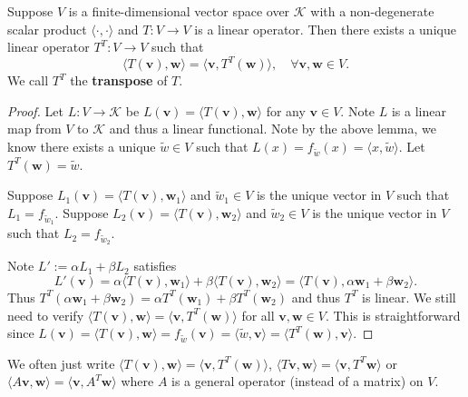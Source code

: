 \documentclass{ctexart}
\begin{document}
    \begin{mythm}\label{transpose existence}
        Suppose $V$ is a finite-dimensional vector space over $\mathcal{K}$ with a non-degenerate scalar product $\langle \cdot, \cdot \rangle$ and $T: V \to V$ is a linear operator. Then there exists a unique linear operator $T^T: V \to V$ such that
        \[
        \langle T(\mathbf{v}), \mathbf{w} \rangle = \langle \mathbf{v}, T^T (\mathbf{w}) \rangle, \quad \forall \mathbf{v}, \mathbf{w} \in V.
        \]
        We call $T^T$ the \textbf{transpose} of $T$.
    \end{mythm}
    \begin{proof}
        Let $L: V \to \mathcal{K}$ be $L(\mathbf{v}) = \langle T(\mathbf{v}), \mathbf{w} \rangle$ for any $\mathbf{v} \in V$. Note $L$ is a linear map from $V$ to $\mathcal{K}$ and thus a linear functional. Note by the above lemma, we know there exists a unique $\tilde{w} \in V$ such that $L(x)=f_{\tilde{w}}(x) = \langle x, \tilde{w} \rangle$. Let $T^T(\mathbf{w}) = \tilde{w}$.

        Suppose $L_1(\mathbf{v}) = \langle T(\mathbf{v}), \mathbf{w}_1 \rangle$ and $\tilde{w}_1 \in V$ is the unique vector in $V$ such that $L_1 = f_{\tilde{w}_1}$. Suppose $L_2(\mathbf{v}) = \langle T(\mathbf{v}), \mathbf{w}_2 \rangle$ and $\tilde{w}_2 \in V$ is the unique vector in $V$ such that $L_2 = f_{\tilde{w}_2}$.

        Note $L' := \alpha L_1 + \beta L_2$ satisfies
        \[
        L'(\mathbf{v}) = \alpha \langle T(\mathbf{v}), \mathbf{w}_1 \rangle + \beta \langle T(\mathbf{v}), \mathbf{w}_2 \rangle = \langle T(\mathbf{v}), \alpha \mathbf{w}_1 + \beta \mathbf{w}_2 \rangle.
        \]
        Thus $T^T(\alpha \mathbf{w}_1 + \beta \mathbf{w}_2) = \alpha T^T(\mathbf{w}_1) + \beta T^T(\mathbf{w}_2)$ and thus $T^T$ is linear. We still need to verify $\langle T(\mathbf{v}), \mathbf{w} \rangle = \langle \mathbf{v}, T^T (\mathbf{w}) \rangle$ for all $\mathbf{v}, \mathbf{w} \in V$. This is straightforward since $L(\mathbf{v}) = \langle T(\mathbf{v}), \mathbf{w} \rangle = f_{\tilde{w}}(\mathbf{v}) = \langle \tilde{w}, \mathbf{v} \rangle = \langle T^T(\mathbf{w}), \mathbf{v} \rangle$.
    \end{proof}
    \begin{myrmk}
        We often just write $\langle T(\mathbf{v}), \mathbf{w} \rangle = \langle \mathbf{v}, T^T (\mathbf{w}) \rangle$, $\langle T\mathbf{v}, \mathbf{w} \rangle = \langle \mathbf{v}, T^T \mathbf{w} \rangle$ or $\langle A\mathbf{v}, \mathbf{w} \rangle = \langle \mathbf{v}, A^T \mathbf{w} \rangle$ where $A$ is a general operator (instead of a matrix) on $V$.
    \end{myrmk}
\end{document}
